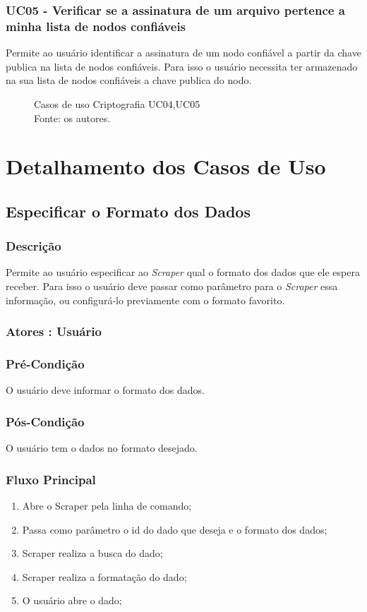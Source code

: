 \subsubsection{UC05 - Verificar se a assinatura de um arquivo pertence a minha lista de nodos confiáveis}
Permite ao usuário identificar a assinatura de um nodo confiável a partir da chave publica na lista de nodos confiáveis. Para isso o usuário necessita ter armazenado na sua lista de nodos confiáveis a chave publica do nodo.
\begin{figure}[H]
    \centering
    
    \caption[Casos de uso Criptografia UC04,UC05]{\label{fig:Ator_Crypto2}
        Casos de uso Criptografia UC04,UC05\\
        Fonte: os autores.
    }
\end{figure}
\section{Detalhamento dos Casos de Uso}

\subsection{Especificar o Formato dos Dados}
\subsubsection{Descrição}
Permite ao usuário especificar ao \textit{Scraper} qual o formato dos dados que ele espera receber. Para isso o usuário deve passar como parâmetro para o \textit{Scraper} essa informação, ou configurá-lo previamente com o formato favorito.
\subsubsection{Atores : Usuário}
\subsubsection{Pré-Condição}
O usuário deve informar o formato dos dados.
\subsubsection{Pós-Condição}
O usuário tem o dados no formato desejado.
\subsubsection{Fluxo Principal}
\begin{enumerate}
    \item Abre o Scraper pela linha de comando;
    \item Passa como parâmetro o id do dado que deseja e o formato dos dados;
    \item Scraper realiza a busca do dado;
    \item Scraper realiza a formatação do dado;
    \item O usuário abre o dado;
\end{enumerate}
